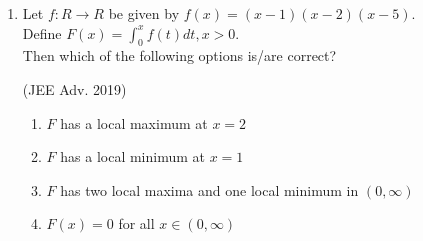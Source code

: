 \documentclass[journal,12pt,twocolumn]{IEEEtran}
\theoremstyle{remark}
\begin{document}
\begin{enumerate}[start = 7]
{            Define the collection $\{E_1, E_2, E_3, .....\}$ of ellipses and $\{R_1, R_2, R_3, .....\}$ of rectangles as follows:\\[6pt]
            $E_1 : \displaystyle\frac{x^2}{9}+\displaystyle \frac{y^2}{4} = 1$;\\[6pt]
            $R_1$: rectangle of largest area, with sides parallel to the axes, inscribes in $E_1$;\\[6pt]
            $E_n : $ ellipse $\displaystyle\frac{x^2}{a_n^2}+\displaystyle \frac{y^2}{b_n^2} = 1$ of largest area inscribed in $R_{n-1}, n>1;$\\[6pt]
            $R_n$: rectangle of largest area, with sides parallel to the axes, inscribes in $E_n$;\\ Then which of the following options is/are correct?
            \begin{flushright}
                {(JEE Adv. 2019)}
            \end{flushright}
            \begin{enumerate}
                \item The eccentricities of $E_{18}$ and $E_{19}$ are not equal
                \item Length of the latus rectum of $E_{9}$ is $\displaystyle\frac{1}{6}$
                \item $\sum_{n=1}^N$ (area of $R_n$) $<$ 24, for each positive integer N
                \item The distance of a focus from the centre in $E_9$ is $\frac{\sqrt{5}}{32}$
            \end{enumerate}
        
        }
        \newpage
    \item{
        
            Let $f: R\rightarrow R$ be given by $f(x) = (x-1)(x-2)(x-5)$.\\[6pt] 
            Define $F(x) = \displaystyle\int_0^x f(t)dt, x>0$.\\[3pt]
            Then which of the following options is/are correct?
            \begin{flushright}
                {(JEE Adv. 2019)}
            \end{flushright}
            \begin{enumerate}
                \item $F$ has a local maximum at $x=2$
                \item $F$ has a local minimum at $x=1$
                \item $F$ has two local maxima and one local minimum in $(0,\infty)$
                \item $F(x) = 0$ for all $x \in (0,\infty)$
            \end{enumerate}
        
}
\end{enumerate}
\end{document}
